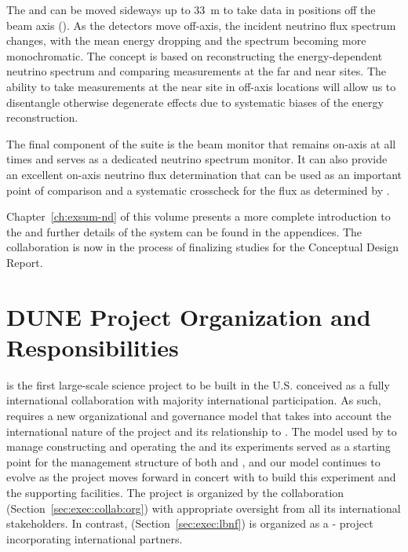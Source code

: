 The  and  can be moved sideways up to \SI{33}{m} to take data in positions off the beam axis (). As the detectors move off-axis, the incident neutrino flux spectrum changes, with the mean energy dropping and the spectrum becoming more monochromatic.  %
The  concept is based on reconstructing the energy-dependent neutrino spectrum and comparing measurements at the far and near sites. The ability to take measurements at the near site in off-axis locations will allow us to 
disentangle otherwise degenerate effects due to systematic biases of the energy reconstruction.

The final component of the   suite is the beam monitor that remains on-axis at all times and
serves as a dedicated  neutrino spectrum monitor. 
It can also provide an excellent on-axis neutrino flux determination that can be used as an important point of comparison and a systematic crosscheck for the flux as determined by . %



Chapter~\ref{ch:exsum-nd} of this  volume presents a more complete introduction to the  and further details of the system can be found in the appendices. The  collaboration is now in the process of finalizing studies for the  Conceptual Design Report.

\section{DUNE Project Organization and Responsibilities} %
\label{es:ch1:intl-org-resp}

 is the first large-scale science project to be built in the U.S. %
conceived as a fully international collaboration with majority international participation. As such,  requires a new organizational and governance model that takes into account the international nature of the project and its relationship
to .
The model used by  to manage constructing and operating the  and its experiments served as a starting point for the %
management structure of both   and , 
and our model continues to evolve as the  project moves forward in concert with  to build this experiment and the supporting facilities.  The  project is %
organized by the  collaboration (Section~\ref{sec:exec:collab:org}) with appropriate oversight from all its  international stakeholders. In contrast, 
 (Section~\ref{sec:exec:lbnf}) %
is organized as a - project incorporating international partners. 



